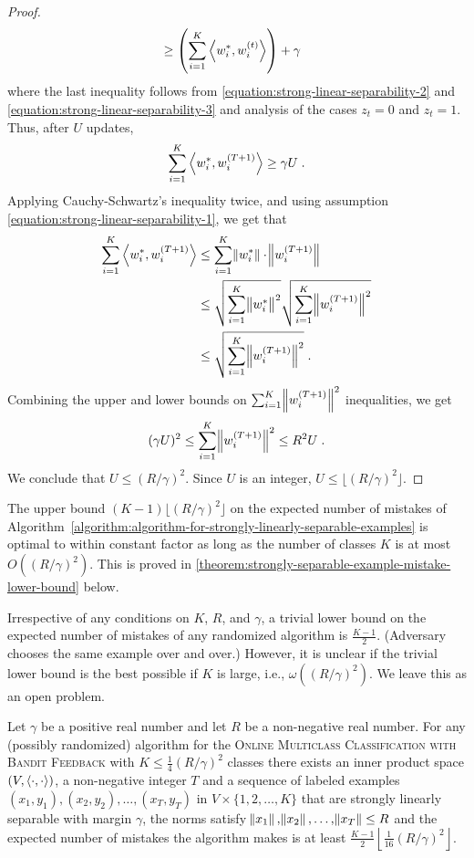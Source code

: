 \begin{proof}
\begin{align*}
& \ge \left( \sum_{i=1}^K \left\langle w_i^*, w_i^{(t)} \right\rangle \right) + \gamma
\end{align*}
where the last inequality follows from \eqref{equation:strong-linear-separability-2}
and \eqref{equation:strong-linear-separability-3} and analysis of the cases $z_t = 0$ and $z_t = 1$.
Thus, after $U$ updates,
$$
\sum_{i=1}^K \left\langle w_i^*, w_i^{(T+1)} \right\rangle \ge \gamma U \; .
$$
Applying Cauchy-Schwartz's inequality twice, and using assumption
\eqref{equation:strong-linear-separability-1}, we get that
\begin{align*}
\sum_{i=1}^K \left\langle w_i^*, w_i^{(T+1)} \right\rangle
& \le \sum_{i=1}^K \norm{w_i^*} \cdot \norm{w_i^{(T+1)}} \\
& \le \sqrt{\sum_{i=1}^K \norm{w_i^*}^2} \sqrt{\sum_{i=1}^K \norm{w_i^{(T+1)}}^2} \\
& \le \sqrt{\sum_{i=1}^K \norm{w_i^{(T+1)}}^2} \; .
\end{align*}
Combining the upper and lower bounds on $\sum_{i=1}^K \norm{w_i^{(T+1)}}^2$ inequalities, we get
$$
(\gamma U)^2 \le \sum_{i=1}^K \norm{w_i^{(T+1)}}^2 \le R^2 U \; .
$$
We conclude that $U \le (R/\gamma)^2$. Since $U$ is an integer, $U \le \lfloor (R/\gamma)^2 \rfloor$.
\end{proof}

The upper bound $(K-1) \lfloor (R/\gamma)^2 \rfloor$ on the expected number of
mistakes of
Algorithm~\ref{algorithm:algorithm-for-strongly-linearly-separable-examples} is
optimal to within constant factor as long as the number of classes $K$ is
at most $O((R/\gamma)^2)$. This is proved in
\autoref{theorem:strongly-separable-example-mistake-lower-bound} below.

Irrespective of any conditions on $K$, $R$, and $\gamma$, a trivial lower bound
on the expected number of mistakes of any randomized algorithm is
$\frac{K-1}{2}$. (Adversary chooses the same example over and over.) However, it
is unclear if the trivial lower bound is the best possible if $K$ is large,
i.e., $\omega((R/\gamma)^2)$. We leave this as an open problem.

\begin{theorem}
\label{theorem:strongly-separable-example-mistake-lower-bound}
Let $\gamma$ be a positive real number and let $R$ be a non-negative real
number. For any (possibly randomized) algorithm for the \textsc{Online
Multiclass Classification with Bandit Feedback} with $K \le
\frac{1}{4}(R/\gamma)^2$ classes there exists an inner product space $(V,
\left\langle \cdot, \cdot \right\rangle)$, a non-negative integer $T$ and a sequence of labeled
examples $(x_1, y_1), (x_2, y_2), \dots, (x_T, y_T)$ in $V \times
\{1,2,\dots,K\}$ that are strongly linearly separable with margin $\gamma$, the
norms satisfy $\norm{x_1}, \norm{x_2}, \dots, \norm{x_T} \le R$ and the expected
number of mistakes the algorithm makes is at least $\frac{K-1}{2} \left\lfloor
\frac{1}{16} (R/\gamma)^2 \right\rfloor$.
\end{theorem}

